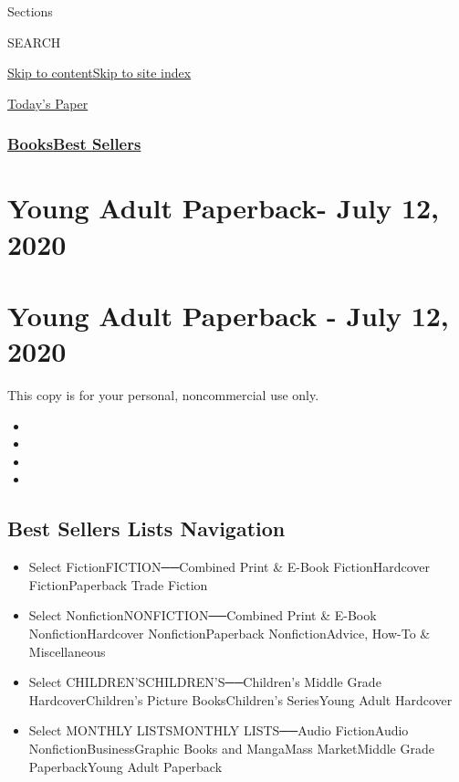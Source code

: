 Sections

SEARCH

\protect\hyperlink{site-content}{Skip to
content}\protect\hyperlink{site-index}{Skip to site index}

\href{https://myaccount.nytimes3xbfgragh.onion/auth/login?response_type=cookie\&client_id=vi}{}

\href{https://www.nytimes3xbfgragh.onion/section/todayspaper}{Today's
Paper}

\hypertarget{booksbest-sellers}{%
\subsubsection{\texorpdfstring{\href{/section/books/}{Books}\textbar{}\href{/books/best-sellers/}{Best
Sellers}}{Books\textbar{}Best Sellers}}\label{booksbest-sellers}}

\hypertarget{young-adult-paperback--july-12-2020}{%
\section{Young Adult Paperback- July 12,
2020}\label{young-adult-paperback--july-12-2020}}

\hypertarget{young-adult-paperback---july-12-2020}{%
\section{Young Adult Paperback - July 12,
2020}\label{young-adult-paperback---july-12-2020}}

This copy is for your personal, noncommercial use only.

\begin{itemize}
\item
\item
\item
\item
\end{itemize}

\hypertarget{best-sellers-lists-navigation}{%
\subsection{Best Sellers Lists
Navigation}\label{best-sellers-lists-navigation}}

\begin{itemize}
\tightlist
\item
  Select FictionFICTION──Combined Print \& E-Book FictionHardcover
  FictionPaperback Trade Fiction
\item
  Select NonfictionNONFICTION──Combined Print \& E-Book
  NonfictionHardcover NonfictionPaperback NonfictionAdvice, How-To \&
  Miscellaneous
\item
  Select CHILDREN'SCHILDREN'S──Children's Middle Grade
  HardcoverChildren's Picture BooksChildren's SeriesYoung Adult
  Hardcover
\item
  Select MONTHLY LISTSMONTHLY LISTS──Audio FictionAudio
  NonfictionBusinessGraphic Books and MangaMass MarketMiddle Grade
  PaperbackYoung Adult Paperback
\end{itemize}

